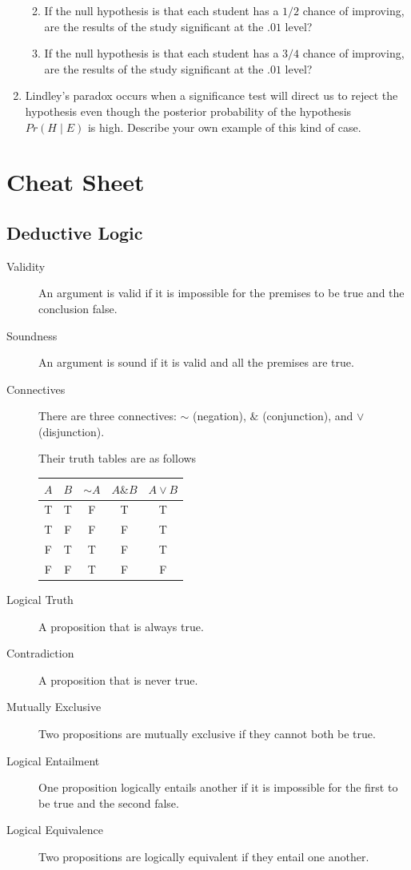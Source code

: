 \documentclass[justified]{tufte-book}
\providecommand{\tightlist}{%
  \setlength{\itemsep}{0pt}\setlength{\parskip}{0pt}}
\newcommand{\given}{\mid}
\renewcommand{\neg}{\mathbin{\sim}}
\renewcommand{\wedge}{\mathbin{\&}}
\newcommand{\p}{Pr}
\theoremstyle{definition}
\theoremstyle{definition}
\theoremstyle{definition}
\theoremstyle{remark}
\begin{document}
\begin{enumerate}
  \begin{enumerate}
  \def\labelenumii{\alph{enumii}.}
  \tightlist
  \item
    If the null hypothesis is that each student has a \(1/2\) chance of
    improving, are the results of the study significant at the \(.01\)
    level?
  \item
    If the null hypothesis is that each student has a \(3/4\) chance of
    improving, are the results of the study significant at the \(.01\)
    level?
  \end{enumerate}
\item
  Lindley's paradox occurs when a significance test will direct us to
  reject the hypothesis even though the posterior probability of the
  hypothesis \(\p(H \given E)\) is high. Describe your own example of
  this kind of case.
\end{enumerate}

\hypertarget{appendix-appendix}{%
\appendix}


\hypertarget{cheat-sheet}{%
\chapter{Cheat Sheet}\label{cheat-sheet}}

\hypertarget{deductive-logic}{%
\section*{Deductive Logic}\label{deductive-logic}}

\begin{description}
\item[Validity]
An argument is valid if it is impossible for the premises to be true and
the conclusion false.
\item[Soundness]
An argument is sound if it is valid and all the premises are true.
\item[Connectives]
There are three connectives: \(\neg\) (negation), \(\wedge\)
(conjunction), and \(\vee\) (disjunction).

Their truth tables are as follows

\begin{longtable}[]{@{}ccccc@{}}
\toprule
\(A\) & \(B\) & \(\neg A\) & \(A \wedge B\) &
\(A \vee B\)\tabularnewline
\midrule
\endhead
T & T & F & T & T\tabularnewline
T & F & F & F & T\tabularnewline
F & T & T & F & T\tabularnewline
F & F & T & F & F\tabularnewline
\bottomrule
\end{longtable}
\item[Logical Truth]
A proposition that is always true.
\item[Contradiction]
A proposition that is never true.
\item[Mutually Exclusive]
Two propositions are mutually exclusive if they cannot both be true.
\item[Logical Entailment]
One proposition logically entails another if it is impossible for the
first to be true and the second false.
\item[Logical Equivalence]
Two propositions are logically equivalent if they entail one another.
\end{description}
\end{document}
